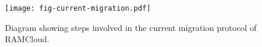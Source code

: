 \begin{figure}[H]
\texttt{[image: fig-current-migration.pdf]}
\caption{Diagram showing steps involved in the current migration protocol of RAMCloud.}
\label{fig:migration-current}
\end{figure}
